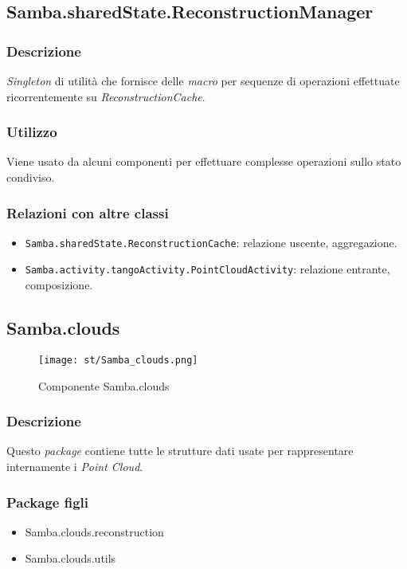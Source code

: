 \subsection{Samba.sharedState.ReconstructionManager}
\subsubsection{Descrizione}
\emph{Singleton} di utilità che fornisce delle \emph{macro} per sequenze di operazioni effettuate ricorrentemente su \emph{ReconstructionCache}.
\subsubsection{Utilizzo}
Viene usato da alcuni componenti per effettuare complesse operazioni sullo stato condiviso.
\subsubsection{Relazioni con altre classi}
\begin{itemize}
	\item \texttt{Samba.sharedState.ReconstructionCache}: relazione uscente, aggregazione.
	\item \texttt{Samba.activity.tangoActivity.PointCloudActivity}: relazione entrante, composizione.	
\end{itemize}


\subsection{Samba.clouds}
\begin{figure}[!h] 
    \centering 
    \texttt{[image: st/Samba\_clouds.png]} 
    \caption{Componente Samba.clouds}
\end{figure}
\subsubsection{Descrizione}
Questo \emph{package} contiene tutte le strutture dati usate per rappresentare internamente i \emph{Point Cloud}.
\subsubsection{Package figli}
\begin{itemize}
	\item Samba.clouds.reconstruction
	\item Samba.clouds.utils
\end{itemize}


